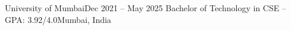 \resumeSubheading
  {University of Mumbai}{Dec 2021 -- May 2025}
  {Bachelor of Technology in CSE -- GPA: 3.92/4.0}{Mumbai, India}
  \resumeItemListStart
  \resumeItemListEnd

